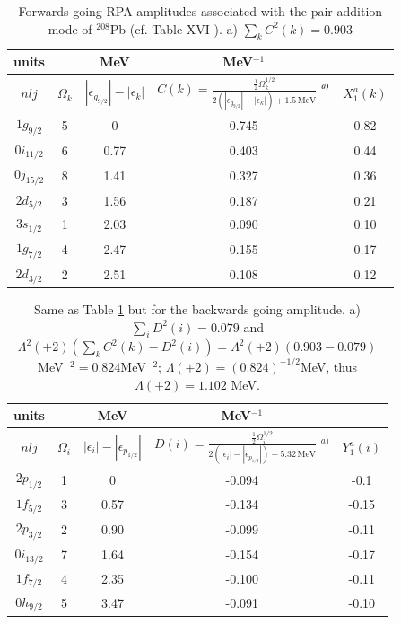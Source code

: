 \begin{table}
\begin{tabular}{|c|c|c|c|c|}
\hline units &  &MeV  &MeV$^{-1}$  &    \\ 
\hline  $nlj$&$\Omega_k$  &$|\epsilon_{g_{9/2}}|-|\epsilon_k|$  &$C(k)=\frac{\frac{1}{2}\Omega_k^{1/2}}{2(|\epsilon_{g_{9/2}}|-|\epsilon_k|)+1.5\,\text{MeV}}$  $\vphantom{\prod}^{a)}$& $X_1^a(k)$  \\ 
\hline  $1g_{9/2}$& 5 &  0& 0.745 &  0.82\\ 
\hline $0i_{11/2}$ & 6 &  0.77&0.403  & 0.44  \\ 
\hline  $0j_{15/2}$& 8 &  1.41&  0.327&  0.36\\ 
\hline  $2d_{5/2}$& 3 & 1.56 & 0.187 & 0.21 \\ 
\hline  $3s_{1/2}$&  1& 2.03 &  0.090& 0.10\\ 
\hline  $1g_{7/2}$&  4& 2.47 & 0.155 &  0.17  \\ 
\hline  $2d_{3/2}$&  2& 2.51 & 0.108 &  0.12 \\ 
\hline 
\end{tabular}\caption{Forwards going RPA amplitudes associated with the pair addition mode of $^{208}$Pb (cf.  Table XVI \cite{Broglia:73}). a) $\sum_{k}C^2(k)=0.903$}\label{tab1E4}
\end{table}
\begin{table}
\begin{tabular}{|c|c|c|c|c|}
\hline units &  &MeV  &MeV$^{-1}$  &    \\ 
\hline  $nlj$&$\Omega_i$  &$|\epsilon_i|-|\epsilon_{p_{1/2}}|$  &$D(i)=\frac{\frac{1}{2}\Omega_i^{1/2}}{2(|\epsilon_i|-|\epsilon_{p_{1/2}}|)+5.32\,\text{MeV}}$ $^{a)}$ & $Y_1^a(i)$  \\ 
\hline  $2p_{1/2}$& 1 &  0& -0.094 &  -0.1\\ 
\hline $1f_{5/2}$ & 3 &  0.57& -0.134  & -0.15 \\ 
\hline  $2p_{3/2}$& 2 &  0.90&  -0.099&  -0.11\\ 
\hline  $0i_{13/2}$& 7 & 1.64 & -0.154 & -0.17 \\ 
\hline  $1f_{7/2}$&  4& 2.35 &  -0.100& -0.11 \\ 
\hline  $0h_{9/2}$&  5& 3.47 & -0.091 &  -0.10  \\ 
\hline 
\end{tabular}\caption{Same as Table \ref{tab1E4} but for the backwards going amplitude. a) $\sum_i D^2(i)=0.079$ and $\Lambda^2(+2) (\sum_k C^2(k)-D^2(i))=\Lambda^2(+2) (0.903-0.079)$ MeV$^{-2}=0.824$MeV$^{-2}$; $\Lambda(+2)=(0.824)^{-1/2}$MeV, thus $\Lambda(+2)=1.102$ MeV.}\label{tab1E5}
\end{table}


